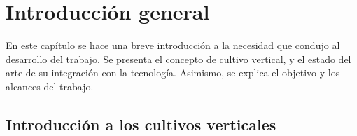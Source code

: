 
\chapter{Introducción general} %

\label{Chapter1} %
\label{IntroGeneral}

En este capítulo se hace una breve introducción a la necesidad que condujo al
desarrollo del trabajo. Se presenta el concepto de cultivo vertical, y el estado del arte de su integración con la tecnología. Asimismo, se explica el objetivo y los alcances del trabajo.


\newcommand{\keyword}[1]{\textbf{#1}}
\newcommand{\tabhead}[1]{\textbf{#1}}
\newcommand{\code}[1]{\texttt{#1}}
\newcommand{\file}[1]{\texttt{\bfseries#1}}
\newcommand{\option}[1]{\texttt{\itshape#1}}
\newcommand{\grados}{$^{\circ}$}



\section{Introducción a los cultivos verticales}



